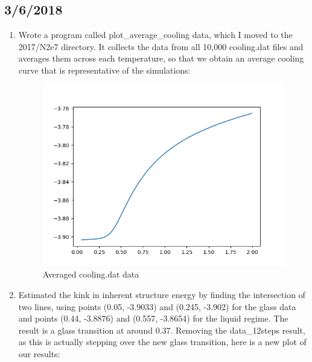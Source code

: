 \documentclass[12pt,reqno]{amsart}
\numberwithin{equation}{section}
\begin{document}
\subsection{3/6/2018}
\begin{enumerate}
\item Wrote a program called plot\_average\_cooling data, which I moved to the 2017/N2e7 directory.  It collects the data from all 10,000 cooling.dat files and averages them across each temperature, so that we obtain an average cooling curve that is representative of the simulations:

\begin{figure}[H]
\centering
\includegraphics[scale=0.6]{average_cooling_data}
\caption{Averaged cooling.dat data}
\end{figure}

\item Estimated the kink in inherent structure energy by finding the intersection of two lines, using points (0.05, -3.9033) and (0.245, -3.902) for the glass data and points (0.44, -3.8876) and (0.557, -3.8654) for the liquid regime.  The result is a glass transition at around 0.37.  Removing the data\_12steps result, as this is actually stepping over the new glass transition, here is a new plot of our results: 


\end{enumerate}
\end{document}
